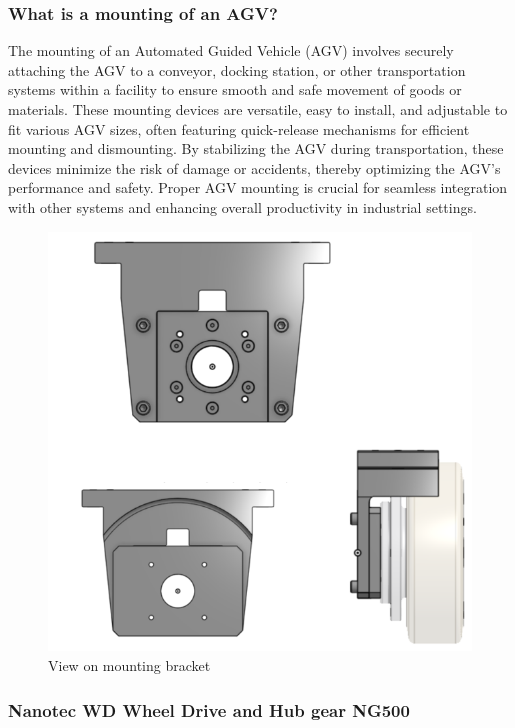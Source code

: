 \documentclass[../../main]{subfiles}
\begin{document}
  \subsubsection{What is a mounting of an AGV?}
  The mounting of an Automated Guided Vehicle (AGV) involves securely attaching the AGV to a conveyor, docking station, or other transportation systems within a facility to ensure smooth and safe movement of goods or materials. These mounting devices are versatile, easy to install, and adjustable to fit various AGV sizes, often featuring quick-release mechanisms for efficient mounting and dismounting. By stabilizing the AGV during transportation, these devices minimize the risk of damage or accidents, thereby optimizing the AGV's performance and safety. Proper AGV mounting is crucial for seamless integration with other systems and enhancing overall productivity in industrial settings.
\begin{figure}[h!]
\centering
\includegraphics[width=\textwidth]{img/wheel3d.png}
\caption{View on mounting bracket}
\end{figure}

\subsubsection{Nanotec WD Wheel Drive and Hub gear NG500}
\end{document}
